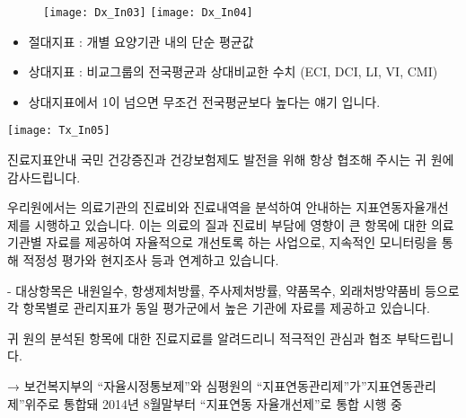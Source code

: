 \begin{figure}
\centering
  \centering
  \texttt{[image: Dx\_In03]}
  \centering
  \texttt{[image: Dx\_In04]}
\end{figure}
\begin{itemize}\tightlist
\item 절대지표 : 개별 요양기관 내의 단순 평균값 
\item 상대지표 : 비교그룹의 전국평균과 상대비교한 수치 (ECI, DCI, LI, VI, CMI)
\item 상대지표에서 1이 넘으면 무조건 전국평균보다 높다는 얘기 입니다.
\end{itemize}
\par
\begin{center}%
  \texttt{[image: Tx\_In05]}
\end{center}%
\begin{commentbox}{진료지표안내}
 국민 건강증진과 건강보험제도 발전을 위해 항상 협조해 주시는 귀 원에 감사드립니다.\par
 우리원에서는 의료기관의 진료비와 진료내역을 분석하여 안내하는 지표연동자율개선제를 시행하고 있습니다. 이는 의료의 질과 진료비 부담에 영향이 큰 항목에 대한 의료기관별 자료를 제공하여 자율적으로 개선토록 하는 사업으로, 지속적인 모니터링을 통해 적정성 평가와 현지조사 등과 연계하고 있습니다.\par
  - 대상항목은 내원일수, 항생제처방률, 주사제처방률, 약품목수, 외래처방약품비 등으로 각 항목별로 관리지표가 동일 평가군에서 높은 기관에 자료를 제공하고 있습니다. \par 
 귀 원의 분석된 항목에 대한 진료지료를 알려드리니 적극적인 관심과 협조 부탁드립니다.\par
→ 보건복지부의 “자율시정통보제”와 심평원의 “지표연동관리제”가”지표연동관리제”위주로  통합돼 2014년  8월말부터 “지표연동 자율개선제”로 통합 시행 중 
\end{commentbox}
